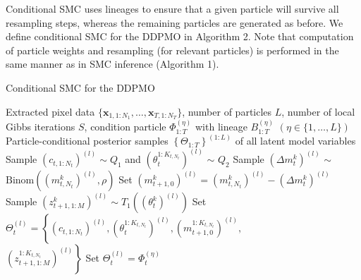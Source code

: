 \documentclass{article}
\begin{document}
Conditional SMC uses lineages to ensure that a given particle will survive all resampling steps, whereas the remaining particles are generated as before. We define conditional SMC for the DDPMO in Algorithm 2. Note that computation of particle weights and resampling (for relevant particles) is performed in the same manner as in SMC inference (Algorithm 1).
\begin{algorithm}[H]
    \caption{Conditional SMC for the DDPMO}
    \label{alg:SMC}
    \begin{algorithmic}[1]
        \REQUIRE Extracted pixel data $\{ \mathbf{x}_{1,1:N_1},\ldots,\mathbf{x}_{T,1:N_T} \}$, 
            number of particles $L$, 
            number of local Gibbs iterations $S$,
            condition particle $\Phi_{1:T}^{(\eta)}$ with lineage $B_{1:T}^{(\eta)}$ 
            \hspace{1mm}$\left(\eta \in \{ 1,\ldots,L \} \right)$
            \ENSURE Particle-conditional posterior samples $\left\{ \Theta_{1:T} \right\}^{(1:L)}$ of all latent model variables
                        \STATE Sample $(c_{t,1:N_t})^{(l)} \sim Q_1$ and 
                        $(\theta_t^{1:K_{t,N_t}})^{(l)}$ $\sim$ $Q_2$ 
                    \ENDFOR
                        \STATE Sample $(\Delta m_t^k)^{(l)}$ $\sim$ $\text{Binom}((m_{t,N_t}^k)^{(l)},\rho)$
                        \STATE Set $(m_{t+1,0}^k)^{(l)} = (m_{t,N_t}^k)^{(l)} - (\Delta m_t^k)^{(l)}$
                        \STATE Sample $(z_{t+1,1:M}^k)^{(l)} \sim T_1((\theta_t^k)^{(l)})$ 
                    \ENDFOR
                    \STATE Set $\Theta_t^{(l)} = 
                        \left\{ (c_{t,1:N_t})^{(l)},(\theta_t^{1:K_{t,N_t}})^{(l)},(m_{t+1,0}^{1:K_{t,N_t}})^{(l)},\right.$\\ 
                        \hspace{15mm} $\left. 
                        (z_{t+1,1:M}^{1:K_{t,N_t}})^{(l)} \right\}$
                \ELSE
                    \STATE Set $\Theta_t^{(l)} = \Phi_t^{(\eta)}$

\end{algorithmic}
\end{algorithm}
\end{document}
